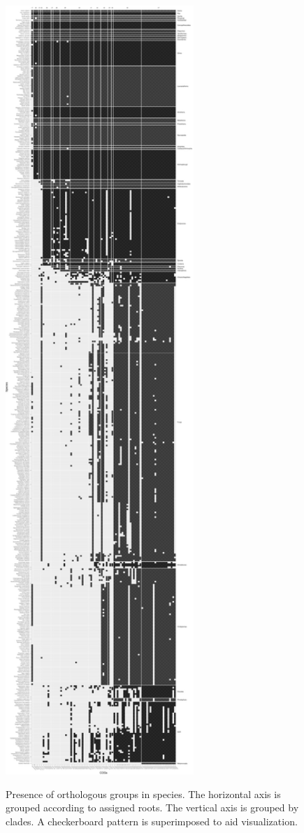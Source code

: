 \clearpage

\thispagestyle{empty}


\pdfpageheight=33in

\begin{figure}[p]

\caption{Presence of orthologous groups in species. The horizontal axis is grouped according to assigned roots. The vertical axis is grouped by clades. A checkerboard pattern is superimposed to aid visualization.}\label{fig:phyletic_patterns}

{\centering \includegraphics[height=31.5in, keepaspectratio]{figs/analysis.geneplast.phyletic_patterns-1} }

\end{figure}

\clearpage

\restoregeometry

\pdfpageheight=11in

